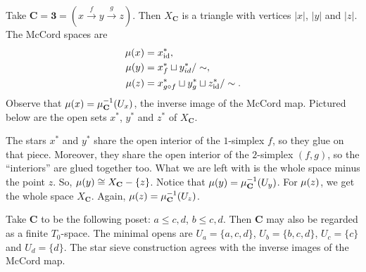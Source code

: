 \begin{example}
\label{ex:ST of the three category}
Take $\mathbf{C} = \mathbf{3} = \left(x \xrightarrow{f} y \xrightarrow{g} z\right)$. Then $X_\mathbf{C}$ is a triangle with vertices $|x|$, $|y|$ and $|z|$. The McCord spaces are
\begin{align*}
\operatorname{\mu}(x) &= x_{\operatorname{id}}^*, \\
\operatorname{\mu}(y) &= x^*_f \sqcup y^*_{id} / \sim, \\
\operatorname{\mu}(z) &= x^*_{g \circ f} \sqcup y^*_{g} \sqcup z^*_{\operatorname{id}} / \sim.
\end{align*}
Observe that $\operatorname{\mu}(x) = \mu^{-1}_{\mathbf{C}}(U_x)$, the inverse image of the McCord map. Pictured below are the open sets $x^*$, $y^*$ and $z^*$ of $X_\mathbf{C}$.

\begin{center}
\end{center}
The stars $x^*$ and $y^*$ share the open interior of the $1$-simplex $f$, so they glue on that piece. Moreover, they share the open interior of the $2$-simplex $(f,g)$, so the ``interiors'' are glued together too. What we are left with is the whole space minus the point $z$. So, $\operatorname{\mu}(y) \cong X_\mathbf{C} - \{z\}$. Notice that $\operatorname{\mu}(y) = \mu^{-1}_{\mathbf{C}}(U_y)$. For $\operatorname{\mu}(z)$, we get the whole space $X_\mathbf{C}$. Again, $\operatorname{\mu}(z) = \mu^{-1}_{\mathbf{C}}(U_z)$.
\end{example}

\begin{example}
\label{ex:ST of our favorite finite space}
Take $\mathbf{C}$ to be the following poset: $a \leq c,d$, $b \leq c,d$. Then $\mathbf{C}$ may also be regarded as a finite $T_0$-space. The minimal opens are $U_a = \{a,c,d\}$, $U_b = \{b,c,d\}$, $U_c = \{c\}$ and $U_d = \{d\}$. The star sieve construction agrees with the inverse images of the McCord map.
\end{example}

